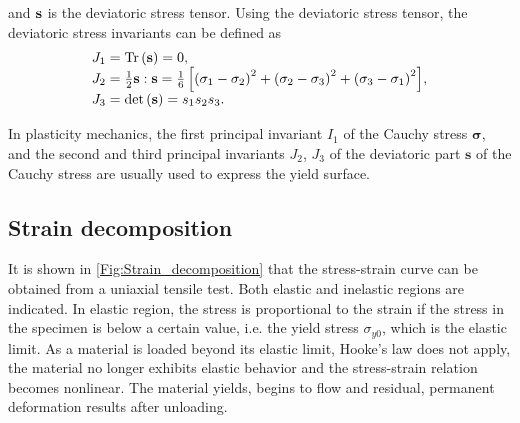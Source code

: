 and $\bf{s}$ is the deviatoric stress tensor.
Using the deviatoric stress tensor, the deviatoric stress invariants can be defined as
\begin{equation}
\begin{array}{*{20}{l}}
{{J_1} = {\rm{Tr}}\left( {\bf{s}} \right) = 0},\\
{{J_2} = \frac{1}{2}{\bf{s}}:{\bf{s}} = \frac{1}{6}\left[ {{{\left( {{\sigma _1} - {\sigma _2}} \right)}^2} + {{\left( {{\sigma _2} - {\sigma _3}} \right)}^2} + {{\left( {{\sigma _3} - {\sigma _1}} \right)}^2}} \right]},\\
{{J_3} = \det \left( {\bf{s}} \right) = {s_1}{s_2}{s_3}}.
\end{array}
\end{equation}

In plasticity mechanics, the first principal invariant $I_1$ of the Cauchy stress $\boldsymbol{\sigma}$, and the second and third principal invariants $J_2$, $J_3$ of the deviatoric part $\boldsymbol{s}$ of the Cauchy stress are usually used to express the yield surface.


\subsection{Strain decomposition}
It is shown in \ref{Fig:Strain_decomposition} that the stress-strain curve can be obtained from a uniaxial tensile test.
Both elastic and inelastic regions are indicated.
In elastic region, the stress is proportional to the strain if the stress in the specimen is below a certain value, i.e. the yield stress $\sigma_{y0}$, which is the elastic limit.
As a material is loaded beyond its elastic limit, Hooke's law does not apply, the material no longer exhibits elastic behavior and the stress-strain relation becomes nonlinear. The material yields, begins to flow and residual, permanent deformation results after unloading.

